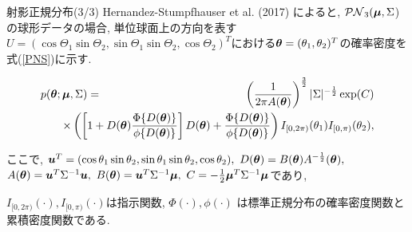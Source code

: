 \documentclass[dvipdfmx]{beamer} %
\newcommand{\bm}[1]{\mbox{\boldmath $#1$}}
\begin{document}
\begin{frame}{射影正規分布(3/3)}
Hernandez-Stumpfhauser et al. (2017) によると, $\mathcal{PN}_3(\bm \mu,\Sigma$)の球形データの場合, 単位球面上の方向を表す$U = (\cos\Theta_1 \sin \Theta_2, \sin\Theta_1 \sin \Theta_2, \cos \Theta_2)^T$における$\bm \theta = (\theta_1, \theta_2)^T$の確率密度を式(\ref{PNS})に示す.

\vspace{-0.5cm}
\footnotesize %
\begin{eqnarray}
\label{PNS}
p(\bm \theta; \bm \mu, \Sigma) &=& \left(\frac{1}{2\pi A(\bm \theta)}\right)^{\frac{3}{2}} |\Sigma|^{-\frac{1}{2}}
\exp(C) \nonumber \\ 
&& \hspace{-1.5cm} \times \left( \left[1 + D(\bm \theta) \frac{\Phi \{D(\bm \theta)\}}{\phi \{D(\bm \theta)\}} \right] D(\bm \theta) + \frac{\Phi \{D(\bm \theta)\}}{\phi \{D(\bm \theta)\}} \right) I_{[0,2\pi)}(\theta_1) I_{[0,\pi)}(\theta_2),
\end{eqnarray}
\normalsize

ここで, $\bm u^T = (\cos\theta_1 \sin \theta_2, \sin\theta_1 \sin \theta_2, \cos \theta_2), \ D(\bm \theta) = B(\bm \theta) A^{-\frac{1}{2}}(\bm \theta),$
$A(\bm \theta) = \bm u^T \Sigma^{-1} \bm u,\ B(\bm \theta) = \bm u^T \Sigma^{-1} \bm \mu, \ C = -\frac{1}{2} \bm \mu^T \Sigma^{-1} \bm \mu$であり, 

$I_{[0,2\pi)} (\cdot), I_{[0,\pi)}(\cdot)$は指示関数, $\Phi(\cdot), \phi(\cdot)$ は標準正規分布の確率密度関数と累積密度関数である. 
\end{frame}
\end{document}
